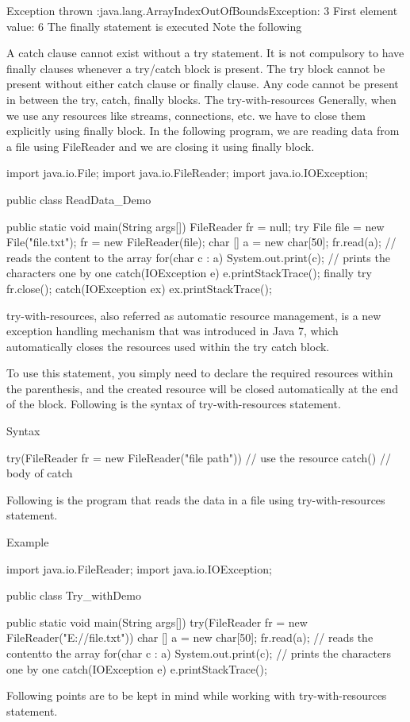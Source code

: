 {Exception thrown  :java.lang.ArrayIndexOutOfBoundsException: 3
First element value: 6
The finally statement is executed
Note the following

A catch clause cannot exist without a try statement.
It is not compulsory to have finally clauses whenever a try/catch block is present.
The try block cannot be present without either catch clause or finally clause.
Any code cannot be present in between the try, catch, finally blocks.
The try-with-resources
Generally, when we use any resources like streams, connections, etc. we have to close them explicitly using finally block. In the following program, we are reading data from a file using FileReader and we are closing it using finally block.

import java.io.File;
import java.io.FileReader;
import java.io.IOException;

public class ReadData_Demo {

   public static void main(String args[]) {
      FileReader fr = null;
      try {
         File file = new File("file.txt");
         fr = new FileReader(file); char [] a = new char[50];
         fr.read(a);   // reads the content to the array
         for(char c : a)
         System.out.print(c);   // prints the characters one by one
      }catch(IOException e) {
         e.printStackTrace();
      }finally {
         try {
            fr.close();
         }catch(IOException ex) {
            ex.printStackTrace();
         }
      }
   }
}
try-with-resources, also referred as automatic resource management, is a new exception handling mechanism that was introduced in Java 7, which automatically closes the resources used within the try catch block.

To use this statement, you simply need to declare the required resources within the parenthesis, and the created resource will be closed automatically at the end of the block. Following is the syntax of try-with-resources statement.

Syntax

try(FileReader fr = new FileReader("file path")) {
   // use the resource
   }catch() {
      // body of catch
   }
}
Following is the program that reads the data in a file using try-with-resources statement.

Example

import java.io.FileReader;
import java.io.IOException;

public class Try_withDemo {

   public static void main(String args[]) {
      try(FileReader fr = new FileReader("E://file.txt")) {
         char [] a = new char[50];
         fr.read(a);   // reads the contentto the array
         for(char c : a)
         System.out.print(c);   // prints the characters one by one
      }catch(IOException e) {
         e.printStackTrace();
      }
   }
}
Following points are to be kept in mind while working with try-with-resources statement.

